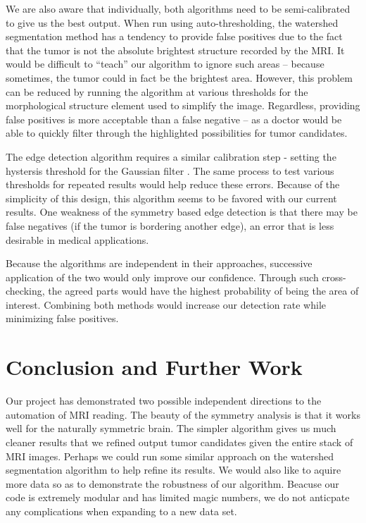 \documentclass[12pt]{article}
\theoremstyle{plain}%
\theoremstyle{definition}
\theoremstyle{remark}
\begin{document}
We are also aware that individually, both algorithms need to be semi-calibrated to give us the best output.  When run using auto-thresholding, the watershed segmentation method has a tendency to provide false positives due to the fact that the tumor is not the absolute brightest structure recorded by the MRI.  It would be difficult to “teach” our algorithm to ignore such areas – because sometimes, the tumor could in fact be the brightest area.  However, this problem can be reduced by running the algorithm at various thresholds for the morphological structure element used to simplify the image.  Regardless, providing false positives is more acceptable than a false negative – as a doctor would be able to quickly filter through the highlighted possibilities for tumor candidates.

The edge detection algorithm requires a similar calibration step - setting the hystersis threshold for the Gaussian filter .  The same process to test various thresholds for repeated results would help reduce these errors.  Because of the simplicity of this design, this algorithm seems to be favored with our current results.  One weakness of the symmetry based edge detection is that there may be false negatives (if the tumor is bordering another edge), an error that is less desirable in medical applications.

Because the algorithms are independent in their approaches, successive application of the two would only improve our confidence.  Through such cross-checking, the agreed parts would have the highest probability of being the area of interest.  Combining both methods would increase our detection rate while minimizing false positives.

\section{Conclusion and Further Work}

Our project has demonstrated two possible independent directions to the automation of MRI reading.  The beauty of the symmetry analysis is that it works well for the naturally symmetric brain.  The simpler algorithm gives us much cleaner results that we refined output tumor candidates given the entire stack of MRI images.  Perhaps we could run some similar approach on the watershed segmentation algorithm to help refine its results.  We would also like to aquire more data so as to demonstrate the robustness of our algorithm.  Beacuse our code is extremely modular and has limited magic numbers, we do not anticpate any complications when expanding to a new data set.
\end{document}
